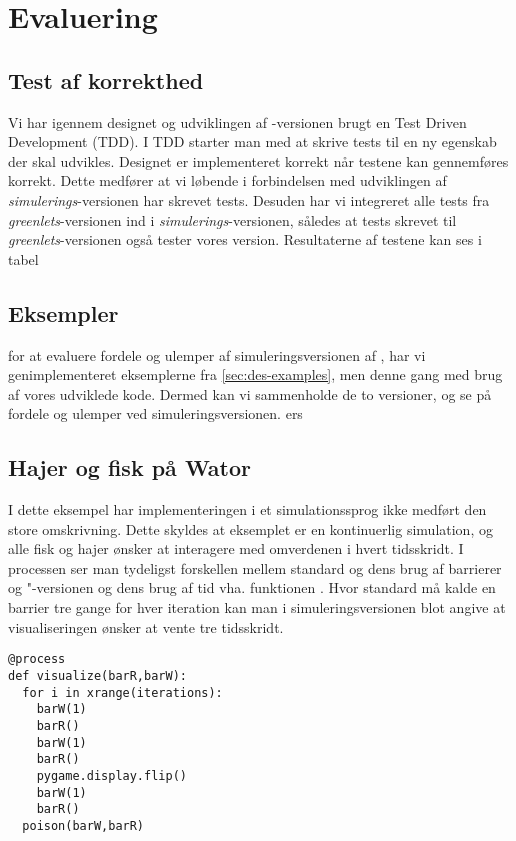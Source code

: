 \section{Evaluering}
\subsection{Test af korrekthed}
  Vi har igennem designet og udviklingen af -versionen brugt en Test Driven Development (TDD). I TDD starter man med at skrive tests til en ny egenskab der skal udvikles. Designet er implementeret korrekt når testene kan gennemføres korrekt. Dette medfører at vi løbende i forbindelsen med udviklingen af \emph{simulerings}-versionen har skrevet tests. Desuden har vi integreret alle tests fra \emph{greenlets}-versionen ind i \emph{simulerings}-versionen, således at tests skrevet til \emph{greenlets}-versionen også tester vores version. Resultaterne af testene kan ses i tabel 
  
\subsection{Eksempler}
for at evaluere fordele og ulemper af simuleringsversionen af \pycsp, har vi genimplementeret eksemplerne fra \cref{sec:des-examples}, men denne gang med  brug af vores udviklede kode. Dermed kan vi sammenholde de to versioner, og se på fordele og ulemper ved simuleringsversionen.
ers

 
\subsection{Hajer og fisk på Wator}
I dette eksempel har implementeringen i et simulationssprog ikke medført den store omskrivning. Dette skyldes at eksemplet er en kontinuerlig simulation, og alle fisk og hajer ønsker at interagere med omverdenen i hvert tidsskridt. I processen  ser man tydeligst forskellen mellem standard \pycsp og dens brug af barrierer og "-versionen og dens brug af tid vha. funktionen . Hvor standard \pycsp må kalde en barrier tre gange for hver iteration kan man i simuleringsversionen blot angive at visualiseringen ønsker at vente tre tidsskridt. 

\begin{lstlisting}[firstnumber=157 ,float=hbtp, label=fig:green:visualize, caption=\code{Greenlets}"-versionen af visualize]
@process
def visualize(barR,barW):
  for i in xrange(iterations):
    barW(1)
    barR()
    barW(1)
    barR()
    pygame.display.flip()
    barW(1)
    barR()
  poison(barW,barR)     
\end{lstlisting}

